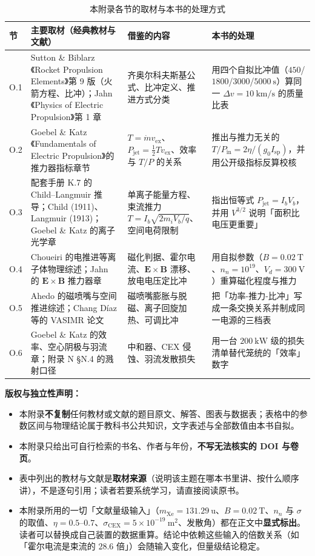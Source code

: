 \begin{table}[htbp]
\centering
\small
\caption{本附录各节的取材与本书的处理方式}
\label{tab:app-o-source}
\begin{tabular}{@{}p{1.1cm}p{4.8cm}p{5.0cm}p{4.4cm}@{}}
\toprule
节 & 主要取材（经典教材与文献） & 借鉴的内容 & 本书的处理 \\
\midrule
O.1 & Sutton \& Biblarz《Rocket Propulsion Elements》第 9 版（火箭方程、比冲）；Jahn《Physics of Electric Propulsion》第 1 章 & 齐奥尔科夫斯基公式、比冲定义、推进方式分类 & 用四个自拟比冲值（$450$/$1800$/$3000$/$5000\ \mathrm{s}$）算同一 $\Delta v=10\ \mathrm{km/s}$ 的质量比表 \\
O.2 & Goebel \& Katz《Fundamentals of Electric Propulsion》的推力器指标章节 & $T=\dot mv_{\mathrm{ex}}$、$P_{\mathrm{jet}}=\frac12Tv_{\mathrm{ex}}$、效率与 $T/P$ 的关系 & 推出与推力无关的 $T/P_{\mathrm{in}}=2\eta/(g_0I_{\mathrm{sp}})$，并用公开级指标反算校核 \\
O.3 & 配套手册 K.7 的 Child--Langmuir 推导；Child (1911)、Langmuir (1913)；Goebel \& Katz 的离子光学章 & 单离子能量方程、束流推力 $T=I_b\sqrt{2m_iV_b/q}$、空间电荷限制 & 指出恒等式 $P_{\mathrm{jet}}=I_bV_b$，并用 $V^{3/2}$ 说明「面积比电压更重要」 \\
O.4 & Choueiri 的电推进等离子体物理综述；Jahn 的 $\mathbf{E}\times\mathbf{B}$ 推力器章 & 磁化判据、霍尔电流、$\mathbf{E}\times\mathbf{B}$ 漂移、放电电压定比冲 & 用自拟参数（$B=0.02\ \mathrm{T}$、$n_n=10^{19}$、$V_d=300\ \mathrm{V}$）重算磁化程度与推力 \\
O.5 & Ahedo 的磁喷嘴与空间推进综述；Chang D\'iaz 等的 VASIMR 论文 & 磁喷嘴膨胀与脱磁、离子回旋加热、可调比冲 & 把「功率-推力-比冲」写成一条交换关系并制成同一电源的三档表 \\
O.6 & Goebel \& Katz 的效率、空心阴极与羽流章；附录 N \S N.4 的溅射口径 & 中和器、CEX 侵蚀、羽流发散损失 & 用一台 $200\ \mathrm{kW}$ 级的损失清单替代笼统的「效率」数字 \\
\bottomrule
\end{tabular}
\end{table}

\textbf{版权与独立性声明：}
\begin{itemize}
\item 本附录\textbf{不复制}任何教材或文献的题目原文、解答、图表与数据表；表格中的参数区间与物理结论属于教科书公共知识，文字表述与全部数值由本书自拟。
\item 本附录只给出可自行检索的书名、作者与年份，\textbf{不写无法核实的 DOI 与卷页}。
\item 表中列出的教材与文献是\textbf{取材来源}（说明该主题在哪本书里讲、按什么顺序讲），不是逐句引用；读者若要系统学习，请直接阅读原书。
\item 本附录所用的一切「文献量级输入」（$m_{\mathrm{Xe}}=131.29\ \mathrm{u}$、$B=0.02\ \mathrm{T}$、$n_n$ 与 $\sigma$ 的取值、$\eta=0.5$--$0.7$、$\sigma_{\mathrm{CEX}}=5\times10^{-19}\ \mathrm{m^2}$、发散角）都在正文中\textbf{显式标出}。读者可以替换成自己装置的数据重算。结论中依赖这些输入的倍数关系（如「霍尔电流是束流的 $28.6$ 倍」）会随输入变化，但量级结论稳定。
\end{itemize}

